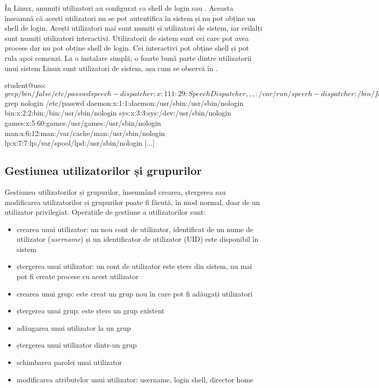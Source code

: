 În Linux, anumiți utilizatori au configurat ca shell de login  sau
. Aceasta înseamnă că acești utilizatori nu se pot autentifica în
sistem și nu pot obține un shell de login. Acești utilizatori mai sunt numiți și
utilizatori de sistem, iar ceilalți sunt numiți utilizatori interactivi.
Utilizatorii de sistem sunt cei care pot avea procese dar nu pot obține shell de
login. Cei interactivi pot obține shell și pot rula apoi comenzi. La o instalare
simplă, o foarte bună parte dintre utilizatorii unui sistem Linux sunt
utilizatori de sistem, așa cum se observă în .

\begin{screen}[caption={Afișarea utilizatorilor de sistem},label={lst:user:system-users}]
student@uso:~$ grep /bin/false /etc/passwd
speech-dispatcher:x:111:29:Speech Dispatcher,,,:/var/run/speech-dispatcher:/bin/false
whoopsie:x:112:117::/nonexistent:/bin/false
hplip:x:118:7:HPLIP system user,,,:/var/run/hplip:/bin/false
gnome-initial-setup:x:120:65534::/run/gnome-initial-setup/:/bin/false
gdm:x:121:125:Gnome Display Manager:/var/lib/gdm3:/bin/false
vboxadd:x:999:1::/var/run/vboxadd:/bin/false

student@uso:~$ grep nologin /etc/passwd
daemon:x:1:1:daemon:/usr/sbin:/usr/sbin/nologin
bin:x:2:2:bin:/bin:/usr/sbin/nologin
sys:x:3:3:sys:/dev:/usr/sbin/nologin
games:x:5:60:games:/usr/games:/usr/sbin/nologin
man:x:6:12:man:/var/cache/man:/usr/sbin/nologin
lp:x:7:7:lp:/var/spool/lpd:/usr/sbin/nologin
[...]
\end{screen}

\subsection{Gestiunea utilizatorilor și grupurilor}
\label{sec:user:groups}

Gestiunea utilizatorilor și grupurilor, însemnând crearea, ștergerea sau
modificarea utilizatorilor și grupurilor poate fi făcută, în mod normal, doar de
un utilizator privilegiat. Operațiile de gestiune a utilizatorilor sunt:

\begin{itemize}
	\item crearea unui utilizator: un nou cont de utilizator, identificat de
          un nume de utilizator (\textit{username}) și un identificator de
		utilizator (UID) este disponibil în sistem
	\item ștergerea unui utilizator: un cont de utilizator este șters din
		sistem, nu mai pot fi create procese cu acest utilizator
	\item crearea unui grup: este creat un grup nou în care pot fi adăugați
		utilizatori
	\item ștergerea unui grup: este șters un grup existent
	\item adăugarea unui utilizator la un grup
	\item ștergerea unui utilizator dintr-un grup
	\item schimbarea parolei unui utilizator
	\item modificarea atributelor unui utilizator: username, login shell,
		director home
\end{itemize}

